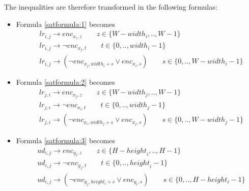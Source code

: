 The inequalities are therefore transformed in the following formulas:
\begin{itemize}
    \item Formula \ref{satformula:1} becomes
        \begin{equation}\label{satformula:1_mod}
        \begin{aligned}
            &lr_{i,j} \rightarrow {enc}_{x_{i},z}  \qquad z \in \{W-{width}_i,..,W-1 \}
            \\
            &lr_{i,j} \rightarrow \neg {enc}_{x_{j},t} \qquad t \in \{ 0,.., {width}_i -1\}
            \\
            &lr_{i,j} \rightarrow (\neg {enc}_{x_{j},{width}_i+s} \vee {enc}_{x_{i},s}) \qquad s \in \{ 0,.., W-{width}_i-1\}
        \end{aligned}
        \end{equation}

    \item Formula \ref{satformula:2} becomes
        \begin{equation}\label{satformula:2_mod}
        \begin{aligned}
            &lr_{j,i} \rightarrow {enc}_{x_{j},z}  \qquad z \in \{W-{width}_j,..,W-1 \}
            \\
            &lr_{j,i} \rightarrow \neg {enc}_{x_{i},t} \qquad t \in \{ 0,.., {width}_j -1\}
            \\
            &lr_{j,i} \rightarrow (\neg {enc}_{x_{i},{width}_j+s} \vee {enc}_{x_{j},s}) \qquad s \in \{ 0,.., W-{width}_j-1\}
        \end{aligned}
        \end{equation}

    \item Formula \ref{satformula:3} becomes
        \begin{equation}\label{satformula:3_mod}
        \begin{aligned}
            &ud_{i,j} \rightarrow {enc}_{y_{i},z} \qquad z \in \{ H-{height}_i,..,H-1 \}
            \\
            &ud_{i,j} \rightarrow \neg{enc}_{y_{j},t} \qquad t \in \{ 0,.., {height}_i -1\}
            \\
            &ud_{i,j} \rightarrow (\neg {enc}_{y_{j},height_{i}+s} \vee enc_{y_{i},s}) \qquad s \in \{ 0, ..,H-height_i-1\}
        \end{aligned}
        \end{equation}


\end{itemize}
